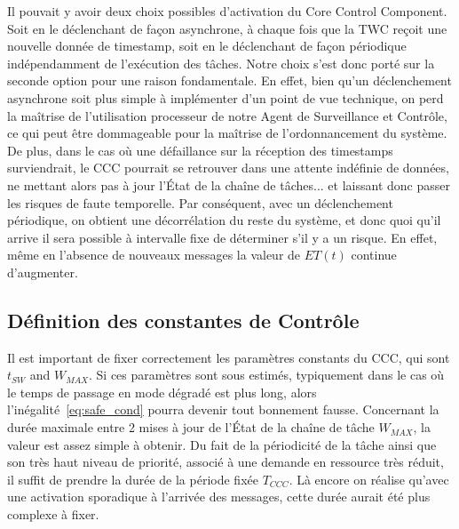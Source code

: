 \documentclass[french, a4paper, 11pt, twoside, pdftex]{StyleThese}
\begin{document}
        Il pouvait y avoir deux choix possibles d'activation du Core Control Component. Soit en le déclenchant de façon asynchrone, à chaque fois que la TWC reçoit une nouvelle donnée de timestamp, soit en le déclenchant de façon périodique indépendamment de l'exécution des tâches. Notre choix s'est donc porté sur la seconde option pour une raison fondamentale. En effet, bien qu'un déclenchement asynchrone soit plus simple à implémenter d'un point de vue technique, on perd la maîtrise de l'utilisation processeur de notre Agent de Surveillance et Contrôle, ce qui peut être dommageable pour la maîtrise de l'ordonnancement du système. De plus, dans le cas où une défaillance sur la réception des timestamps surviendrait, le CCC pourrait se retrouver dans une attente indéfinie de données, ne mettant alors pas à jour l'État de la chaîne de tâches... et laissant donc passer les risques de faute temporelle. Par conséquent, avec un déclenchement périodique, on obtient une décorrélation du reste du système, et donc quoi qu'il arrive il sera possible à intervalle fixe de déterminer s'il y a un risque. En effet, même en l'absence de nouveaux messages la valeur de $ET(t)$ continue d'augmenter. 
        
        
		\subsection{Définition des constantes de Contrôle}
        Il est important de fixer correctement les paramètres constants du CCC, qui sont $t_{SW}$ and $W_{MAX}$.
        Si ces paramètres sont sous estimés, typiquement dans le cas où le temps de passage en mode dégradé est plus long, alors l'inégalité~\ref{eq:safe_cond} pourra devenir tout bonnement fausse. 
        Concernant la durée maximale entre 2 mises à jour de l'État de la chaîne de tâche $W_{MAX}$, la valeur est assez simple à obtenir. Du fait de la périodicité de la tâche ainsi que son très haut niveau de priorité, associé à une demande en ressource très réduit, il suffit de prendre la durée de la période fixée $T_{CCC}$. Là encore on réalise qu'avec une activation sporadique à l'arrivée des messages, cette durée aurait été plus complexe à fixer. 
        
\end{document}
